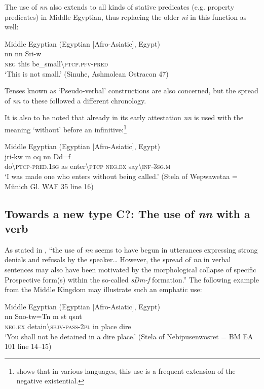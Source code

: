 \documentclass[output=paper]{langsci/langscibook}
\begin{document}
The use of \textit{nn} also extends to all kinds of stative predicates (e.g. property predicates) in Middle Egyptian, thus replacing the older \textit{ni} in this function as well: 

\ea Middle Egyptian (Egyptian [Afro-Asiatic], Egypt) \label{ex:AE32}\\ 
    \gll nn nn Sri-w \\
    \textsc{neg} this be\_small\textbackslash\textsc{ptcp.pfv-pred}\\ 
    \glt ‘This is not small.’ (Sinuhe, Ashmolean Ostracon 47)
\z 
 
Tenses known as ‘Pseudo-verbal’ constructions are also concerned, but the spread of \textit{nn} to these followed a different chronology. 
 
It is also to be noted that already in its early attestation \textit{nn} is used with the meaning ‘without’ before an infinitive:\footnote{\citet[118]{Veselinova2013} shows that in various languages, this use is a frequent extension of the negative existential.}

\ea Middle Egyptian (Egyptian [Afro-Asiatic], Egypt) \label{ex:AE33}\\ 
    \gll jri-kw m oq nn Dd=f \\
    do\textbackslash\textsc{ptcp-pred.1sg} as enter\textbackslash\textsc{ptcp} \textsc{neg.ex} say\textbackslash\textsc{inf-3sg.m}\\ 
    \glt ‘I was made one who enters without being called.’ (Stela of Wepwawetaa = Münich Gl. WAF 35 line 16) 
\z 

\subsection{Towards a new type C?: The use of \textit{nn} with a verb}\label{s:AE2-4}

As stated in \citet[258]{Loprieno-etal2017}, ``the use of \textit{nn} seems to have begun in utterances expressing strong denials and refusals by the speaker… However, the spread of \textit{nn} in verbal sentences may also have been motivated by the morphological collapse of specific Prospective form(s) within the so-called \textit{sDm-f} formation.''
The following example from the Middle Kingdom may illustrate such an emphatic use: 
 
\ea Middle Egyptian (Egyptian [Afro-Asiatic], Egypt) \label{ex:AE34}\\
    \gll nn Sno-tw=Tn m st qsnt \\
    \textsc{neg.ex} detain\textbackslash\textsc{sbjv-pass-2pl} in place dire\\ 
    \glt ‘You shall not be detained in a dire place.’ (Stela of Nebipusenwosret = BM EA 101 line 14–15) 
\z 
\end{document}
